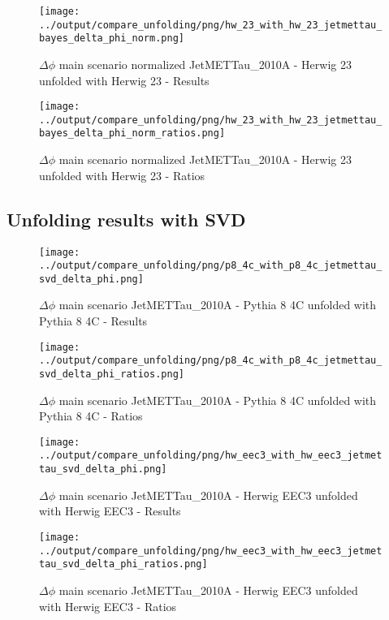 \documentclass[11pt]{book}
\begin{document}
\begin{figure}[ht]
\centering
\texttt{[image: ../output/compare\_unfolding/png/hw\_23\_with\_hw\_23\_jetmettau\_bayes\_delta\_phi\_norm.png]}
\caption{$\Delta\phi$ main scenario normalized JetMETTau\_2010A - Herwig 23 unfolded with Herwig 23 - Results}
\label{hw_23_hw_23_jetmettau_delta_phi_norm_a}
\end{figure}

\begin{figure}[ht]
\centering
\texttt{[image: ../output/compare\_unfolding/png/hw\_23\_with\_hw\_23\_jetmettau\_bayes\_delta\_phi\_norm\_ratios.png]}
\caption{$\Delta\phi$ main scenario normalized JetMETTau\_2010A - Herwig 23 unfolded with Herwig 23 - Ratios}
\label{hw_23_jetmettau_delta_phi_norm_b}
\end{figure}



\clearpage
\subsection{Unfolding results with SVD}

\begin{figure}[ht]
\centering
\texttt{[image: ../output/compare\_unfolding/png/p8\_4c\_with\_p8\_4c\_jetmettau\_svd\_delta\_phi.png]}
\caption{$\Delta\phi$ main scenario JetMETTau\_2010A - Pythia 8 4C unfolded with Pythia 8 4C - Results}
\label{p8_p8_jetmettau_svd_delta_phi_a}
\end{figure}

\begin{figure}[ht]
\centering
\texttt{[image: ../output/compare\_unfolding/png/p8\_4c\_with\_p8\_4c\_jetmettau\_svd\_delta\_phi\_ratios.png]}
\caption{$\Delta\phi$ main scenario JetMETTau\_2010A - Pythia 8 4C unfolded with Pythia 8 4C - Ratios}
\label{p8_p8_jetmettau_svd_delta_phi_b}
\end{figure}

\begin{figure}[ht]
\centering
\texttt{[image: ../output/compare\_unfolding/png/hw\_eec3\_with\_hw\_eec3\_jetmettau\_svd\_delta\_phi.png]}
\caption{$\Delta\phi$ main scenario JetMETTau\_2010A - Herwig EEC3 unfolded with Herwig EEC3 - Results}
\label{hw_eec3_hw_eec3_jetmettau_svd_delta_phi_a}
\end{figure}

\begin{figure}[ht]
\centering
\texttt{[image: ../output/compare\_unfolding/png/hw\_eec3\_with\_hw\_eec3\_jetmettau\_svd\_delta\_phi\_ratios.png]}
\caption{$\Delta\phi$ main scenario JetMETTau\_2010A - Herwig EEC3 unfolded with Herwig EEC3 - Ratios}
\label{hw_eec3_jetmettau_svd_delta_phi_b}
\end{figure}
\end{document}
